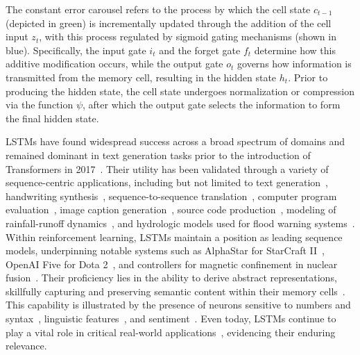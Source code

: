 The constant error carousel refers to the process by which the cell state $c_{t-1}$ (depicted in green) is incrementally updated through the addition of the cell input $z_t$, with this process regulated by sigmoid gating mechanisms (shown in blue). Specifically, the input gate $i_t$ and the forget gate $f_t$ determine how this additive modification occurs, while the output gate $o_t$ governs how information is transmitted from the memory cell, resulting in the hidden state $h_t$. Prior to producing the hidden state, the cell state undergoes normalization or compression via the function $\psi$, after which the output gate selects the information to form the final hidden state.

LSTMs have found widespread success across a broad spectrum of domains \citep{Hochreiter:01,Hochreiter:07,Schmidhuber:15} and remained dominant in text generation tasks prior to the introduction of Transformers in 2017~\citep{Vaswani:17}. Their utility has been validated through a variety of sequence-centric applications, including but not limited to text generation~\citep{Graves:13,Karpathy:15blog}, handwriting synthesis~\citep{Graves:13}, sequence-to-sequence translation~\citep{Sutskever:14nips}, computer program evaluation~\citep{Zaremba:14arxiv}, image caption generation~\citep{Karpathy:15,Hossain:19}, source code production~\citep{Karpathy:15blog}, modeling of rainfall-runoff dynamics~\citep{Kratzert:18,Kratzert:19}, and hydrologic models used for flood warning systems~\citep{Nearing:24}. Within reinforcement learning, LSTMs maintain a position as leading sequence models, underpinning notable systems such as AlphaStar for StarCraft II~\citep{Vinyals:17short}, OpenAI Five for Dota 2~\citep{OpenAI:19}, and controllers for magnetic confinement in nuclear fusion~\citep{Degrave:22short}. Their proficiency lies in the ability to derive abstract representations, skillfully capturing and preserving semantic content within their memory cells~\citep{Karpathy:15blog}. This capability is illustrated by the presence of neurons sensitive to numbers and syntax~\citep{Lakretz:19}, linguistic features~\citep{Bau:19}, and sentiment~\citep{Radford:17arxiv}. Even today, LSTMs continue to play a vital role in critical real-world applications~\citep{Degrave:22short,Nearing:24}, evidencing their enduring relevance.

